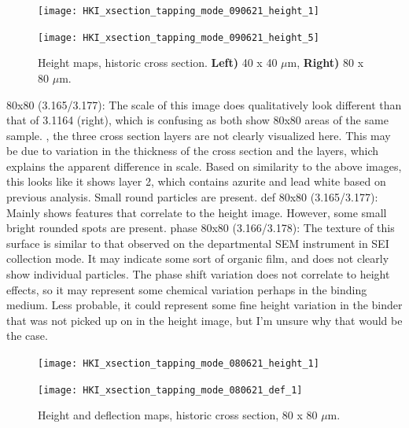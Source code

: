 \begin{figure}[H]
\centering
\begin{minipage}{.45\textwidth}
  \centering
  \texttt{[image: HKI\_xsection\_tapping\_mode\_090621\_height\_1]}
\end{minipage}
\begin{minipage}{.45\textwidth}
  \centering
  \texttt{[image: HKI\_xsection\_tapping\_mode\_090621\_height\_5]}
\end{minipage}
\caption[Height maps, historic cross section]{Height maps, historic cross section. \textbf{Left)} 40 x 40 $\mu$m, \textbf{Right)} 80 x 80 $\mu$m.}
\label{fig:afm_xsection_height_1}
\end{figure}

80x80 (3.165/3.177): The scale of this image does qualitatively look different than that of 3.1164 (right), which is confusing as both show 80x80 areas of the same sample. \additionally, the three cross section layers are not clearly visualized here. This may be due to variation in the thickness of the cross section and the layers, which explains the apparent difference in scale. Based on similarity to the above images, this looks like it shows layer 2, which contains azurite and lead white based on previous analysis. Small round particles are present.
def 80x80 (3.165/3.177): Mainly shows features that correlate to the height image. However, some small bright rounded spots are present.
phase 80x80 (3.166/3.178): The texture of this surface is similar to that observed on the departmental SEM instrument in SEI collection mode. It may indicate some sort of organic film, and does not clearly show individual particles. The phase shift variation does not correlate to height effects, so it may represent some chemical variation perhaps in the binding medium. Less probable, it could represent some fine height variation in the binder that was not picked up on in the height image, but I’m unsure why that would be the case.




\begin{figure}[H]
\centering
\begin{minipage}{.45\textwidth}
  \centering
  \texttt{[image: HKI\_xsection\_tapping\_mode\_080621\_height\_1]}
\end{minipage}
\begin{minipage}{.45\textwidth}
  \centering
  \texttt{[image: HKI\_xsection\_tapping\_mode\_080621\_def\_1]}
\end{minipage}
\caption[Height and deflection maps, historic cross section]{Height and deflection maps, historic cross section, 80 x 80 $\mu$m.}
\label{fig:afm_xsection_height_def_1}
\end{figure}

